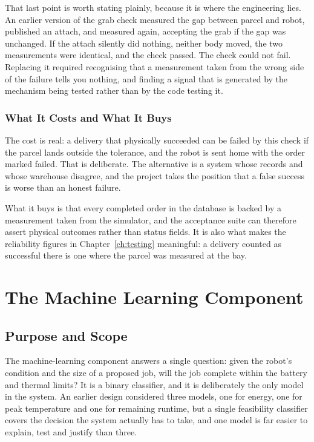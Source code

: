 \documentclass[12pt,a4paper]{report}
\begin{document}
That last point is worth stating plainly, because it is where the engineering lies. An earlier
version of the grab check measured the gap between parcel and robot, published an attach, and
measured again, accepting the grab if the gap was unchanged. If the attach silently did nothing,
neither body moved, the two measurements were identical, and the check passed. The check could not
fail. Replacing it required recognising that a measurement taken from the wrong side of the failure
tells you nothing, and finding a signal that is generated by the mechanism being tested rather than
by the code testing it.

\subsection{What It Costs and What It Buys}
The cost is real: a delivery that physically succeeded can be failed by this check if the parcel
lands outside the tolerance, and the robot is sent home with the order marked failed. That is
deliberate. The alternative is a system whose records and whose warehouse disagree, and the project
takes the position that a false success is worse than an honest failure.

What it buys is that every completed order in the database is backed by a measurement taken from
the simulator, and the acceptance suite can therefore assert physical outcomes rather than status
fields. It is also what makes the reliability figures in Chapter~\ref{ch:testing} meaningful: a
delivery counted as successful there is one where the parcel was measured at the bay.

\chapter{The Machine Learning Component}
\label{ch:ml}

\section{Purpose and Scope}
The machine-learning component answers a single question: given the robot's condition and the size
of a proposed job, will the job complete within the battery and thermal limits? It is a binary
classifier, and it is deliberately the only model in the system. An earlier design considered three
models, one for energy, one for peak temperature and one for remaining runtime, but a single
feasibility classifier covers the decision the system actually has to take, and one model is far
easier to explain, test and justify than three.
\end{document}
